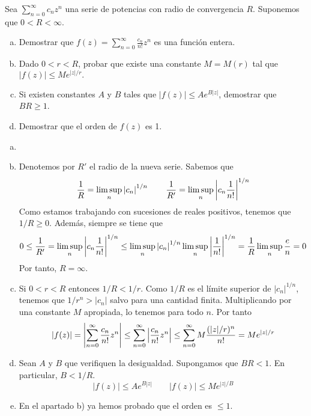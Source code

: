 \documentclass[twoside]{article}
\begin{document}
\newpage
\begin{ejercicio}{3}
Sea $\sum_{n=0}^\infty c_n z^n$ una serie de potencias con  radio de convergencia  $R$. Suponemos que $0<R<\infty$.  
\begin{enumerate}[a)]
\item  Demostrar que 
$\displaystyle{f(z)=\sum_{n=0}^\infty \frac{c_n}{n!}z^n}$
es una función  entera. 
\item  Dado $0<r<R$, probar que existe una constante $M=M(r)$ tal que 
$|f(z)|\le Me^{|z|/r}.$
\item  Si existen constantes $A$ y $B$ tales que $|f(z)|\le A e^{B|z|}$, demostrar que 
$BR\ge 1$.
\item Demostrar que el orden de $f(z)$ es 1.
\end{enumerate}
\end{ejercicio}
\begin{solucion}
\begin{enumerate}[a)]
\item[]
\item Denotemos por $R'$ el radio de la nueva serie. Sabemos que
$$
\frac{1}{R} = \limsup_n \left\lvert c_n\right\rvert^{1/n} \qquad\frac{1}{R'} = \limsup_n \left\lvert c_n\frac{1}{n!}\right\rvert^{1/n}
$$
Como estamos trabajando con sucesiones de reales positivos, tenemos que $1/R\geq 0$. Además, siempre se tiene que
$$
0\leq \frac{1}{R'}=\limsup_n \left\lvert c_n\frac{1}{n!}\right\rvert^{1/n} \leq \limsup_n \left\lvert c_n\right\rvert^{1/n}\limsup_n\left\lvert\frac{1}{n!}\right\rvert^{1/n} = \frac{1}{R}\limsup_n \frac{e}{n} = 0
$$
Por tanto, $R=\infty$.
\item Si $0<r<R$ entonces $1/R < 1/r$. Como $1/R$ es el límite superior de $|c_n|^{1/n}$, tenemos que $1/r^n > |c_n|$ salvo para una cantidad finita. Multiplicando por una constante $M$ apropiada, lo tenemos para todo $n$. Por tanto
$$
|f(z)| = \left\lvert\sum_{n=0}^\infty \frac{c_n}{n!}z^n\right\rvert\leq \sum_{n=0}^\infty \left\lvert\frac{c_n}{n!}z^n\right\rvert \leq \sum_{n=0}^\infty M{\frac{(|z|/r)^n}{n!}} = Me^{|z|/r}
$$
\item Sean $A$ y $B$ que verifiquen la desigualdad. Supongamos que $BR<1$. En particular, $B<1/R$.
$$
|f(z)|\leq Ae^{B|z|} \qquad |f(z)|\leq Me^{|z|/B}
$$
\item En el apartado b) ya hemos probado que el orden es $\leq 1$.
\end{enumerate}
\end{solucion}
\end{document}
